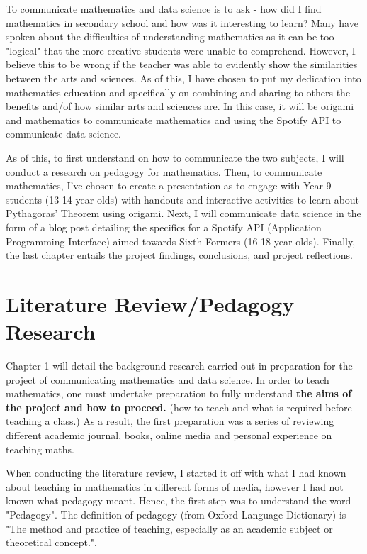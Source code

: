 \documentclass[12pt, a4paper,oneside]{book}
\numberwithin{equation}{section}
\begin{document}
To communicate mathematics and data science is to ask - how did I find mathematics in secondary school and how was it interesting to learn? Many have spoken about the difficulties of understanding mathematics as it can be too "logical" that the more creative students were unable to comprehend. However, I believe this to be {\color{red}wrong} if the teacher was able to evidently show the similarities between the arts and sciences. As of this, I have chosen to put my dedication into mathematics education and specifically on combining and sharing to others the benefits and/of how similar arts and sciences are. In this case, it will be origami and mathematics to communicate mathematics and using the Spotify API to communicate data science.

As of this, to first understand on how to communicate the two subjects, I will conduct a research on pedagogy for mathematics. Then, to communicate mathematics, I've chosen to create a presentation as to engage with Year 9 students (13-14 year olds) with handouts and interactive activities to learn about Pythagoras' Theorem using origami. Next, I will communicate data science in the form of a blog post detailing the specifics for a Spotify API (Application Programming Interface) aimed towards Sixth Formers (16-18 year olds). Finally, the last chapter entails the project findings, conclusions, and project reflections.

\chapter{Literature Review/Pedagogy Research}\label{ch:2}

Chapter 1 will detail the background research carried out in preparation for the project of communicating mathematics and data science. In order to teach mathematics, one must undertake preparation to fully understand {\color{red}\textbf{the aims of the project and how to proceed.}} (how to teach and what is required before teaching a class.)  As a result, the first preparation was a series of reviewing different academic journal, books, online media and personal experience on teaching maths.


When conducting the literature review, I started it off with what I had known about teaching in mathematics in different forms of media, however I had not known what pedagogy meant. Hence, the first step was to understand the word "Pedagogy".
The definition of pedagogy (from Oxford Language Dictionary) is "The method and practice of teaching, especially as an academic subject or theoretical concept.".
\end{document}
